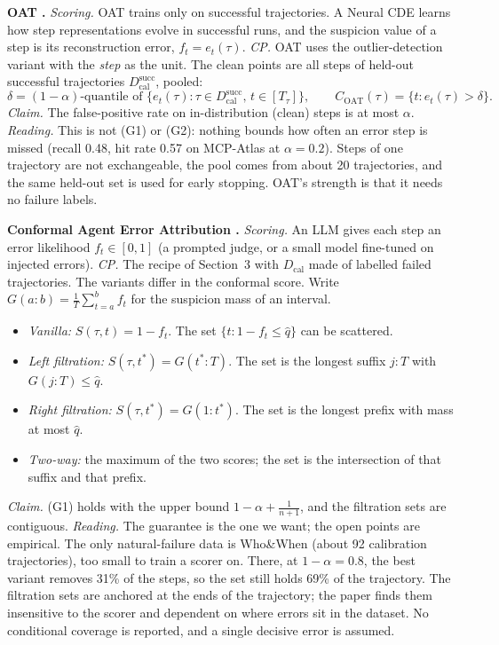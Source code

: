 \documentclass[10pt,a4paper]{article}
\makeatletter
\renewcommand\section{\@startsection{section}{1}{\z@}{6pt plus 2pt minus 1pt}{2pt}{\normalsize\bfseries}}
\newcommand{\traj}{\tau}
\newcommand{\tstar}{t^{*}}
\newcommand{\qhat}{\hat q}
\newcommand{\Dcal}{D_{\mathrm{cal}}}
\newcommand{\C}{C}
\makeatother
\begin{document}
\section{Existing Approaches}

\textbf{OAT \cite{yeh2026oat}.} \emph{Scoring.} OAT trains only on successful trajectories. A Neural CDE learns how step representations evolve in successful runs, and the suspicion value of a step is its reconstruction error, $f_t=e_t(\traj)$. \emph{CP.} OAT uses the outlier-detection variant with the \emph{step} as the unit. The clean points are all steps of held-out successful trajectories $D^{\mathrm{succ}}_{\mathrm{cal}}$, pooled:
\[
\delta=\text{$(1-\alpha)$-quantile of }\{e_t(\traj):\traj\in D^{\mathrm{succ}}_{\mathrm{cal}},\,t\in[T_\traj]\},\qquad \C_{\mathrm{OAT}}(\traj)=\{t: e_t(\traj)>\delta\}.
\]
\emph{Claim.} The false-positive rate on in-distribution (clean) steps is at most $\alpha$. \emph{Reading.} This is not (G1) or (G2): nothing bounds how often an error step is missed (recall 0.48, hit rate 0.57 on MCP-Atlas at $\alpha=0.2$). Steps of one trajectory are not exchangeable, the pool comes from about 20 trajectories, and the same held-out set is used for early stopping. OAT's strength is that it needs no failure labels.

\textbf{Conformal Agent Error Attribution \cite{feng2026conformal}.} \emph{Scoring.} An LLM gives each step an error likelihood $f_t\in[0,1]$ (a prompted judge, or a small model fine-tuned on injected errors). \emph{CP.} The recipe of Section~3 with $\Dcal$ made of labelled failed trajectories. The variants differ in the conformal score. Write $G(a{:}b)=\tfrac{1}{T}\sum_{t=a}^{b}f_t$ for the suspicion mass of an interval.
\begin{itemize}
\item \emph{Vanilla:} $S(\traj,t)=1-f_t$. The set $\{t:1-f_t\le\qhat\}$ can be scattered.
\item \emph{Left filtration:} $S(\traj,\tstar)=G(\tstar{:}T)$. The set is the longest suffix $j{:}T$ with $G(j{:}T)\le\qhat$.
\item \emph{Right filtration:} $S(\traj,\tstar)=G(1{:}\tstar)$. The set is the longest prefix with mass at most $\qhat$.
\item \emph{Two-way:} the maximum of the two scores; the set is the intersection of that suffix and that prefix.
\end{itemize}
\emph{Claim.} (G1) holds with the upper bound $1-\alpha+\tfrac{1}{n+1}$, and the filtration sets are contiguous. \emph{Reading.} The guarantee is the one we want; the open points are empirical. The only natural-failure data is Who\&When (about 92 calibration trajectories), too small to train a scorer on. There, at $1-\alpha=0.8$, the best variant removes 31\% of the steps, so the set still holds 69\% of the trajectory. The filtration sets are anchored at the ends of the trajectory; the paper finds them insensitive to the scorer and dependent on where errors sit in the dataset. No conditional coverage is reported, and a single decisive error is assumed.
\end{document}
